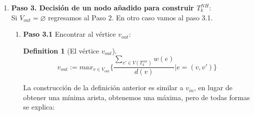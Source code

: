 \documentclass[letter,10pt]{article}
\theoremstyle{definition}
\newtheorem{definition}{Definition}[section]
\begin{document}
\begin{enumerate}{}
\begin{enumerate}
        \begin{align*}
            T^{NH}_{k+1} \leftarrow (V(T^{NH}_{k+1}), E(T^{NH}_{k+1})-\{e_{max}\} )
        \end{align*}
        \item[] \textbf{Paso 2.5} Iterar hasta asegurarse que no hay mejor trayectoria que conecte a  $v_{in}$ con $T^{cur}_k$:\\
        Iteramos desde el paso 2.3 mientras que $E_{in_1}\neq \varnothing$. Observamos que a medida que iteramos, vamos a ir conectando a el vértice $v_{in}$ con las distintas posibles aristas que lo conectan con la trayectoria $T^{cur}_k$ intentando construir una $k+1$-trayectoria sobre nuestra $k$-trayectoria actual $T^{cur}_k$ de forma que tenga el menor costo posible. \\

        Cuando $E_{in_1} = \varnothing$ entonces declaramos nuestro conjunto de vértices $V_{out}$ como:
        \begin{align*}
            V_{out} \leftarrow V(T^{cur}_k)
        \end{align*}
        Y a partir de este momento continuamos en el paso 3.
    \end{enumerate}
    \item[] \textbf{Paso 3. Decisión de un nodo añadido para construir $T^{NH}_k$}:\\
    Si $V_{out} = \varnothing$ regresamos al Paso 2. En otro caso vamos al paso 3.1.
    \begin{enumerate}
        \item[] \textbf{Paso 3.1} Encontrar al vértice $v_{out}$:\\
        \begin{definition}[El vértice $v_{out}$]
            \[
                v_{out} := 
                max_{v\in V_{out}}
                    \Bigg \{ \frac{\sum_{v'\in V(T^{cur}_k )} w(e)}{d(v)} \Big | e = (v,v')
                    \Bigg \} 
            \]
        \end{definition}
        La construcción de la definición anterior es similar a $v_{in}$, en lugar de obtener una mínima arista, obtenemos una máxima, pero de todas formas se explica:


\end{enumerate}
\end{enumerate}
\end{document}
